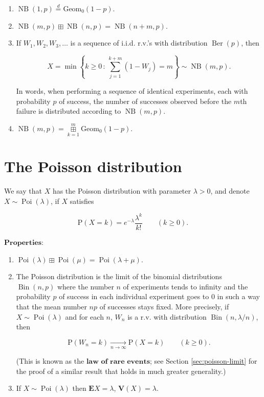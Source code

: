 \documentclass[11pt]{report}
\theoremstyle{plain}
\theoremstyle{definition}
\begin{document}
\begin{enumerate}[label=\arabic*.]
\item $\operatorname{NB}(1,p) \stackrel{d}{=}
\operatorname{Geom_0}(1-p)$.

\item $\operatorname{NB}(m,p) \boxplus
\operatorname{NB}(n,p) = \operatorname{NB}(n+m,p)$.

\item If $W_1,W_2,W_3, \ldots$ is a sequence of i.i.d.
r.v.'s with distribution $\operatorname{Ber}(p)$,
then

\[
X = \min\left\{ k\ge 0\,:\, \sum_{j=1}^{k+m} (1-W_j) = m\right\}  \sim \operatorname{NB}(m,p).
\]

\noindent In words, when performing a sequence of identical
experiments, each with probability $p$ of success,
the number of successes observed before the $m$th
failure is distributed according to
$\operatorname{NB}(m,p)$.

\item $\operatorname{NB}(m,p) =
\mathop{\boxplus}\limits_{k=1}^m
\operatorname{Geom_0}(1-p)$.
\end{enumerate}

\section{The Poisson distribution}

We say that $X$ has the Poisson distribution with
parameter $\lambda>0$, and denote
$X\sim \operatorname{Poi}(\lambda)$, if $X$ satisfies

\[
\mathrm{P}(X=k) = e^{-\lambda} \frac{\lambda^k}{k!} \qquad (k\ge 0).
\]

\noindent $\textbf{Properties:}$

\begin{enumerate}[label=\arabic*.]
\item $\operatorname{Poi}(\lambda) \mathop{\boxplus}
\operatorname{Poi}(\mu) =
\operatorname{Poi}(\lambda+\mu)$.

\item The Poisson distribution is the limit of the binomial
distributions $\operatorname{Bin}(n,p)$ where the
number $n$ of experiments tends to infinity and the
probability $p$ of success in each individual
experiment goes to $0$ in such a way that the mean
number $np$ of successes stays fixed. More precisely,
if $X\sim \operatorname{Poi}(\lambda)$ and for each
$n$, $W_n$ is a r.v. with distribution
$\operatorname{Bin}(n,\lambda/n)$, then

\[
\mathrm{P}(W_n = k) \xrightarrow[n\to\infty]{} \mathrm{P}(X=k) \qquad (k\ge 0).
\]

\noindent (This is known as the $\textbf{law of rare events}$;
see Section \ref{sec:poisson-limit} for the proof of a
similar result that holds in much greater generality.)

\item If $X \sim \operatorname{Poi}(\lambda)$ then
$\mathbf{E} X = \lambda$, $\mathbf{V}(X)=\lambda$.
\end{enumerate}
\end{document}
